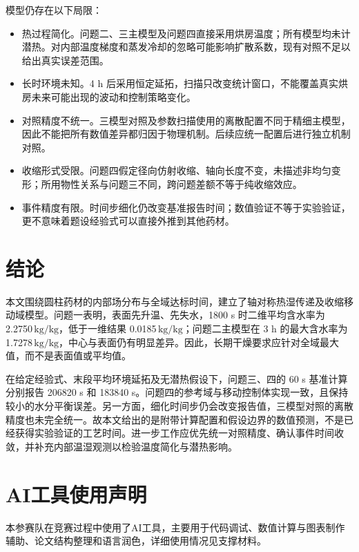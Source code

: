 \documentclass[withoutpreface,bwprint]{cumcmthesis}
\newcommand{\kgkg}{\ensuremath{\mathrm{kg/kg}}}
\begin{document}
模型仍存在以下局限：

\begin{itemize}
  \item 热过程简化。问题二、三主模型及问题四直接采用烘房温度；所有模型均未计潜热。对内部温度梯度和蒸发冷却的忽略可能影响扩散系数，现有对照不足以给出真实误差范围。
  \item 长时环境未知。4 h 后采用恒定延拓，扫描只改变统计窗口，不能覆盖真实烘房未来可能出现的波动和控制策略变化。
  \item 对照精度不统一。三模型对照及参数扫描使用的离散配置不同于精细主模型，因此不能把所有数值差异都归因于物理机制。后续应统一配置后进行独立机制对照。
  \item 收缩形式受限。问题四假定径向仿射收缩、轴向长度不变，未描述非均匀变形；所用物性关系与问题三不同，跨问题差额不等于纯收缩效应。
  \item 事件精度有限。时间步细化仍改变基准报告时间；数值验证不等于实验验证，更不意味着题设经验式可以直接外推到其他药材。
\end{itemize}

\section{结论}

本文围绕圆柱药材的内部场分布与全域达标时间，建立了轴对称热湿传递及收缩移动域模型。问题一表明，表面先升温、先失水，1800 s 时二维平均含水率为 2.2750\,\kgkg，低于一维结果 0.0185\,\kgkg；问题二主模型在 3 h 的最大含水率为 1.7278\,\kgkg，中心与表面仍有明显差异。因此，长期干燥要求应针对全域最大值，而不是表面值或平均值。

在给定经验式、末段平均环境延拓及无潜热假设下，问题三、四的 60 s 基准计算分别报告 206820 s 和 183840 s。问题四的参考域与移动控制体实现一致，且保持较小的水分平衡误差。另一方面，细化时间步仍会改变报告值，三模型对照的离散精度也未完全统一。故本文给出的是附带计算配置和假设边界的数值预测，不是已经获得实验验证的工艺时间。进一步工作应优先统一对照精度、确认事件时间收敛，并补充内部温湿观测以检验温度简化与潜热影响。

\section*{AI工具使用声明}

本参赛队在竞赛过程中使用了AI工具，主要用于代码调试、数值计算与图表制作辅助、论文结构整理和语言润色，详细使用情况见支撑材料。
\end{document}
